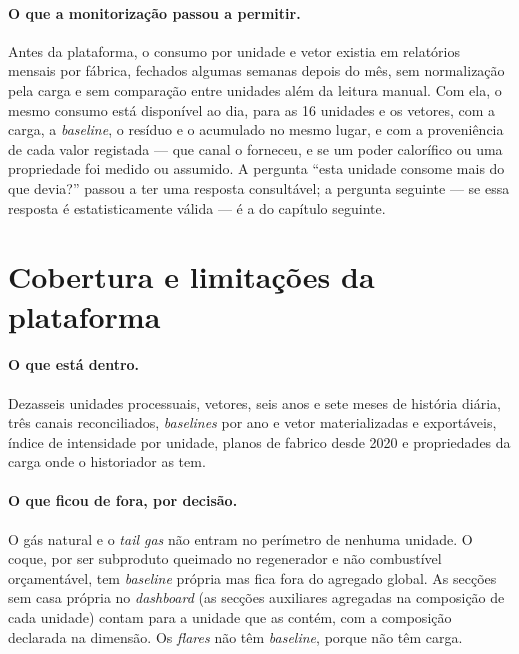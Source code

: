 \paragraph{O que a monitorização passou a permitir.} Antes da plataforma,
o consumo por unidade e vetor existia em relatórios mensais por fábrica,
fechados algumas semanas depois do mês, sem normalização pela carga e sem
comparação entre unidades além da leitura manual. Com ela, o mesmo consumo
está disponível ao dia, para as 16 unidades e os  vetores, com a
carga, a \emph{baseline}, o resíduo e o acumulado no mesmo lugar, e com a
proveniência de cada valor registada --- que canal o forneceu, e se um
poder calorífico ou uma propriedade foi medido ou assumido. A pergunta
``esta unidade consome mais do que devia?'' passou a ter uma resposta
consultável; a pergunta seguinte --- se essa resposta é estatisticamente
válida --- é a do capítulo seguinte.

\section{Cobertura e limitações da plataforma}
\label{sec:cobertura}


\paragraph{O que está dentro.} Dezasseis unidades processuais, 
vetores, seis anos e sete meses de história diária, três canais
reconciliados, \emph{baselines} por ano e vetor materializadas e
exportáveis, índice de intensidade por unidade, planos de fabrico desde
2020 e propriedades da carga onde o historiador as tem.

\paragraph{O que ficou de fora, por decisão.} O gás natural e o
\emph{tail gas} não entram no perímetro de nenhuma unidade. O coque, por
ser subproduto queimado no regenerador e não combustível orçamentável,
tem \emph{baseline} própria mas fica fora do agregado global. As secções
sem casa própria no \emph{dashboard} (as secções auxiliares agregadas na
composição de cada unidade) contam para a unidade que as contém, com a
composição declarada na dimensão. Os \emph{flares} não têm
\emph{baseline}, porque não têm carga.

